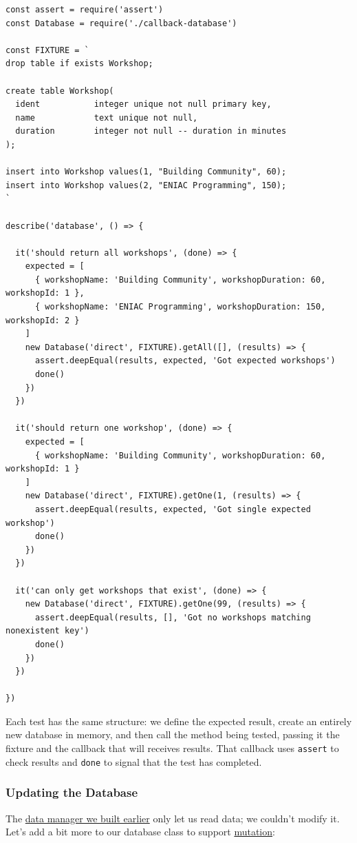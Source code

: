 \begin{verbatim}
const assert = require('assert')
const Database = require('./callback-database')

const FIXTURE = `
drop table if exists Workshop;

create table Workshop(
  ident           integer unique not null primary key,
  name            text unique not null,
  duration        integer not null -- duration in minutes
);

insert into Workshop values(1, "Building Community", 60);
insert into Workshop values(2, "ENIAC Programming", 150);
`

describe('database', () => {

  it('should return all workshops', (done) => {
    expected = [
      { workshopName: 'Building Community', workshopDuration: 60, workshopId: 1 },
      { workshopName: 'ENIAC Programming', workshopDuration: 150, workshopId: 2 }
    ]
    new Database('direct', FIXTURE).getAll([], (results) => {
      assert.deepEqual(results, expected, 'Got expected workshops')
      done()
    })
  })

  it('should return one workshop', (done) => {
    expected = [
      { workshopName: 'Building Community', workshopDuration: 60, workshopId: 1 }
    ]
    new Database('direct', FIXTURE).getOne(1, (results) => {
      assert.deepEqual(results, expected, 'Got single expected workshop')
      done()
    })
  })

  it('can only get workshops that exist', (done) => {
    new Database('direct', FIXTURE).getOne(99, (results) => {
      assert.deepEqual(results, [], 'Got no workshops matching nonexistent key')
      done()
    })
  })

})
\end{verbatim}

Each test has the same structure: we define the expected result, create
an entirely new database in memory, and then call the method being
tested, passing it the fixture and the callback that will receives
results. That callback uses \texttt{assert} to check results and
\texttt{done} to signal that the test has completed.

\subsubsection{Updating the Database}\label{s:db-mutate}

The \protect\hyperlink{s:dataman}{data manager we built earlier} only
let us read data; we couldn't modify it. Let's add a bit more to our
database class to support \protect\hyperlink{g:mutation}{mutation}:

